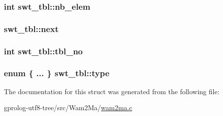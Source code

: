 \subsubsection[{\texorpdfstring{nb\+\_\+elem}{nb_elem}}]{\setlength{\rightskip}{0pt plus 5cm}int swt\+\_\+tbl\+::nb\+\_\+elem}\hypertarget{structswt__tbl_a1f108cb255f34e0e43fd548bdeaa2a3e}{}\label{structswt__tbl_a1f108cb255f34e0e43fd548bdeaa2a3e}
\subsubsection[{\texorpdfstring{next}{next}}]{ swt\+\_\+tbl\+::next}\hypertarget{structswt__tbl_aed3e3921525480876c83cfab6c82ae3b}{}\label{structswt__tbl_aed3e3921525480876c83cfab6c82ae3b}
\subsubsection[{\texorpdfstring{tbl\+\_\+no}{tbl_no}}]{\setlength{\rightskip}{0pt plus 5cm}int swt\+\_\+tbl\+::tbl\+\_\+no}\hypertarget{structswt__tbl_a83f05356288e3c0f11cf0539a4a64eaa}{}\label{structswt__tbl_a83f05356288e3c0f11cf0539a4a64eaa}
\subsubsection[{\texorpdfstring{type}{type}}]{\setlength{\rightskip}{0pt plus 5cm}enum \{ ... \} 
   swt\+\_\+tbl\+::type}\hypertarget{structswt__tbl_a6b1e4dc1e07f951ebe6ea23a9567e0ca}{}\label{structswt__tbl_a6b1e4dc1e07f951ebe6ea23a9567e0ca}


The documentation for this struct was generated from the following file\+:\begin{DoxyCompactItemize}
\item 
gprolog-\/utf8-\/tree/src/\+Wam2\+Ma/\hyperlink{wam2ma_8c}{wam2ma.\+c}\end{DoxyCompactItemize}
